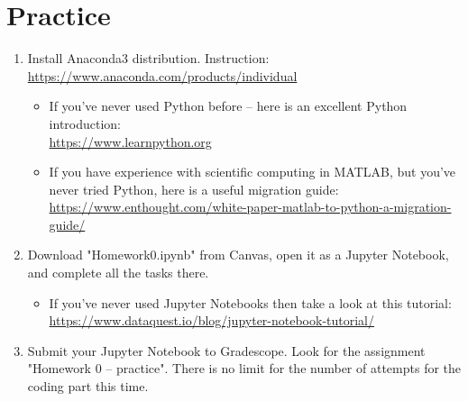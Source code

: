 \documentclass[11pt]{amsart}
\begin{document}
\section{Practice}
\begin{enumerate}
	\item Install Anaconda3 distribution. Instruction:\\ \href{https://www.anaconda.com/products/individual}{https://www.anaconda.com/products/individual}
		\begin{itemize}
			\item 		If you've never used Python before -- here is an excellent Python introduction: \\  \href{https://www.learnpython.org}{https://www.learnpython.org}
			\item If you have experience with scientific computing in MATLAB, but you've never tried Python, here is a useful migration guide: \\\href{https://www.enthought.com/white-paper-matlab-to-python-a-migration-guide/}{https://www.enthought.com/white-paper-matlab-to-python-a-migration-guide/}
		\end{itemize}
	\item Download "Homework0.ipynb" from Canvas, open it as a Jupyter Notebook, and complete all the tasks there.
		\begin{itemize}
			\item If you've never used Jupyter Notebooks then take a look at this tutorial:
		\href{https://www.dataquest.io/blog/jupyter-notebook-tutorial/}{https://www.dataquest.io/blog/jupyter-notebook-tutorial/}
		\end{itemize}

	\item Submit your Jupyter Notebook to Gradescope. Look for the assignment "Homework 0 -- practice". There is no limit for the number of attempts for the coding part this time. 
\end{enumerate}
\end{document}
